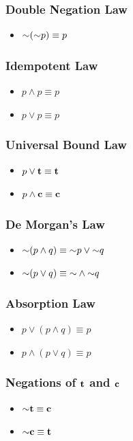\subsubsection{Double Negation Law}
\begin{itemize}
  \item $\mathord{\sim} (\mathord{\sim} p) \equiv p$
\end{itemize}

\subsubsection{Idempotent Law}
\begin{itemize}
  \item $p \wedge p \equiv p$
  \item $p \vee p \equiv p$
\end{itemize}

\subsubsection{Universal Bound Law}
\begin{itemize}
  \item $p \vee \mathbf{t} \equiv \mathbf{t}$
  \item $p \wedge \mathbf{c} \equiv \mathbf{c}$
\end{itemize}

\subsubsection{De Morgan's Law}
\begin{itemize}
  \item $\mathord{\sim} (p \wedge q) \equiv \mathord{\sim} p \vee \mathord{\sim} q$
  \item $\mathord{\sim} (p \vee q) \equiv \mathord{\sim} \wedge \mathord{\sim} q$
\end{itemize}

\subsubsection{Absorption Law}
\begin{itemize}
  \item $p \vee (p \wedge q) \equiv p$
  \item $p \wedge (p \vee q) \equiv p$
\end{itemize}

\subsubsection{Negations of \texorpdfstring{$\mathbf{t}$}{t} and \texorpdfstring{$\mathbf{c}$}{c}}
\begin{itemize}
  \item $\mathord{\sim} \mathbf{t} \equiv \mathbf{c}$
  \item $\mathord{\sim} \mathbf{c} \equiv \mathbf{t}$
\end{itemize}


